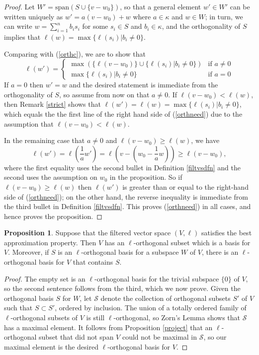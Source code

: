 \documentclass[11pt]{amsart}
\theoremstyle{definition}
\newtheorem{prop}[theorem]{Proposition}
\theoremstyle{remark}
\numberwithin{equation}{section}
\begin{document}
\begin{proof}
	Let $W'=\mathrm{span}(S\cup\{v-w_0\})$, so that a general element $w'\in W'$ can be written uniquely as $w'=a(v-w_0)+w$ where $a\in\kappa$ and $w\in W$; in turn, we can write $w=\sum_{i=1}^{n}b_is_i$ for some $s_i\in S$ and $b_i\in\kappa$, and the orthogonality of $S$ implies that $\ell(w)=\max\{\ell(s_i)|b_i\neq 0\}$.
	
	Comparing with (\ref{orthc}), we are to show that  \begin{equation}\label{orthneed}
	\ell(w')=\left\{\begin{array}{ll} \max\left(\{\ell(v-w_0)\}\cup\{\ell(s_i)|b_i\neq 0\}\right) & \mbox{if }a\neq 0  \\  \max\{\ell(s_i)|b_i\neq 0\} & \mbox{if }a=0 \end{array}\right. 	
		\end{equation}
	If $a=0$ then $w'=w$ and the desired statement is immediate from the orthogonality of $S$, so assume from now on that $a\neq 0$.  If $\ell(v-w_0)<\ell(w)$, then Remark \ref{strict} shows that $\ell(w')=\ell(w)=  \max\{\ell(s_i)|b_i\neq 0\}$, which equals the the first line of the right hand side of (\ref{orthneed}) due to the assumption that $\ell(v-w_0)<\ell(w)$.
	
	In the remaining case that $a\neq 0$ and $\ell(v-w_0)\geq \ell(w)$, we have \[ \ell(w')=\ell\left(\frac{1}{a}w'\right)=\ell\left(v-\left(w_0-\frac{1}{a}w\right)\right)\geq \ell(v-w_0),\] where the first equality uses the second bullet in Definition \ref{filtvsdfn} and the second uses the assumption on $w_0$ in the proposition. So if $\ell(v-w_0)\geq \ell(w)$ then $\ell(w')$ is  greater than or equal to the right-hand side of (\ref{orthneed}); on the other hand, the reverse inequality is immediate from the third bullet in Definition \ref{filtvsdfn}.  This proves (\ref{orthneed}) in all cases, and hence proves the proposition.	

\end{proof}

\begin{prop}\label{orthbasis}
	Suppose that the filtered vector space $(V,\ell)$ satisfies the best approximation property. Then $V$ has an $\ell$-orthogonal subset which is a basis for $V$.  Moreover, if $S$ is an $\ell$-orthogonal basis for a subspace $W$ of $V$, there is an $\ell$-orthogonal basis for $V$ that contains $S$.  
\end{prop}

\begin{proof}
	The empty set is an $\ell$-orthogonal basis for the trivial subspace $\{0\}$ of $V$, so the second sentence follows from the third, which we now prove.  Given the orthogonal basis $S$ for $W$, let $\mathcal{S}$ denote the collection of orthogonal subsets $S'$ of $V$ such that $S\subset S'$, ordered by inclusion.  The union of a totally ordered family of $\ell$-orthogonal subsets of $V$ is still $\ell$-orthogonal, so Zorn's Lemma shows that $\mathcal{S}$ has a maximal element. It follows from Proposition \ref{project} that an $\ell$-orthogonal subset that did not span $V$ could not be maximal in $\mathcal{S}$, so our maximal element is the desired $\ell$-orthogonal basis for $V$.    
\end{proof}
\end{document}

